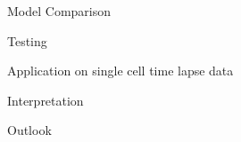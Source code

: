 \documentclass[pdf]
{beamer}
\begin{document}
\begin{frame}{Model Comparison}

\end{frame}

\begin{frame}{Testing}

\end{frame}

\begin{frame}{Application on single cell time lapse data}

\end{frame}

\begin{frame}{Interpretation}

\end{frame}

\begin{frame}{Outlook}

\end{frame}
\end{document}

